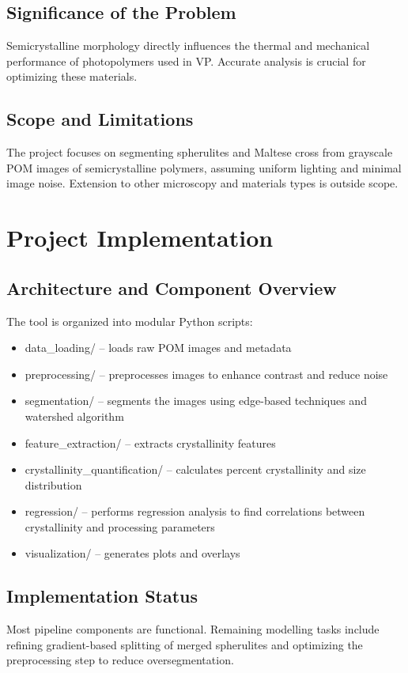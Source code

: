 \documentclass[12pt]{article}
\begin{document}
\subsection{Significance of the Problem}
Semicrystalline morphology directly influences the thermal and mechanical performance of photopolymers used in VP. 
Accurate analysis is crucial for optimizing these materials.

\subsection{Scope and Limitations}
The project focuses on segmenting spherulites and Maltese cross from grayscale POM images of semicrystalline polymers, 
assuming uniform lighting and minimal image noise. Extension to other microscopy and materials types is outside scope.

\section{Project Implementation}

\subsection{Architecture and Component Overview}
The tool is organized into modular Python scripts:
\begin{itemize}[noitemsep]
    \item data\_loading/ -- loads raw POM images and metadata
    \item preprocessing/ -- preprocesses images to enhance contrast and reduce noise
    \item segmentation/ -- segments the images using edge-based techniques and watershed algorithm
    \item feature\_extraction/ -- extracts crystallinity features
    \item crystallinity\_quantification/ -- calculates percent crystallinity and size distribution
    \item regression/ -- performs regression analysis to find correlations between crystallinity and processing parameters
    \item visualization/ -- generates plots and overlays
\end{itemize}

\subsection{Implementation Status}
Most pipeline components are functional. Remaining modelling tasks include refining gradient-based splitting of merged spherulites and 
optimizing the preprocessing step to reduce oversegmentation. 
\end{document}
